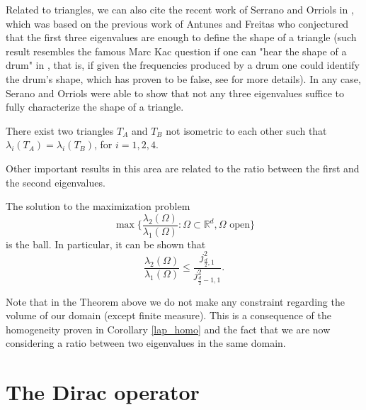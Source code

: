 Related to triangles, we can also cite the recent work of Serrano and Orriols in \cite{gomez2021any}, which was based on the previous work of Antunes and Freitas \cite{antunes2011inverse} who conjectured that the first three eigenvalues are enough to define the shape of a triangle (such result resembles the famous Marc Kac question if one can "hear the shape of a drum" in \cite{kac1966can}, that is, if given the frequencies produced by a drum one could identify the drum's shape, which has proven to be false, see \cite{gordon1992isospectral} for more details). In any case, Serano and Orriols were able to show that not any three eigenvalues suffice to fully characterize the shape of a triangle.
\begin{theorem}
    There exist two triangles \(T_A\) and \(T_B\) not isometric to each other such that \(\lambda_i(T_A) = \lambda_i(T_B)\), for \(i=1, 2, 4\).    
\end{theorem}

Other important results in this area are related to the ratio between the first and the second eigenvalues.
\begin{theorem}\label{ashbaugh-benguria theorem}
    The solution to the maximization problem
    \[
    \max \Big\{\frac{\lambda_2(\Omega)}{\lambda_1(\Omega)}: \Omega \subset \mathbb{R}^d, \Omega \text{ open} \Big\}
    \]
    is the ball. In particular, it can be shown that
    \[
    \frac{\lambda_2(\Omega)}{\lambda_1(\Omega)}  \leq \frac{j_{\frac{d}{2},1}^2}{j_{\frac{d}{2}-1,1}^2}.
    \]
\end{theorem}

\begin{remark}
    Note that in the Theorem above we do not make any constraint regarding the volume of our domain (except finite measure). This is a consequence of the homogeneity proven in Corollary \eqref{lap_homo} and the fact that we are now considering a ratio between two eigenvalues in the same domain.
\end{remark}


\section{The Dirac operator}
 
